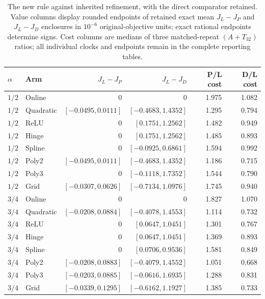 \begin{table}[htbp]
\centering\scriptsize
\setlength{\tabcolsep}{3pt}
\caption{The new rule against inherited refinement, with the direct comparator retained. Value columns display rounded endpoints of retained exact mean $J_L-J_P$ and $J_L-J_D$ enclosures in $10^{-6}$ original-objective units; exact rational endpoints determine signs. Cost columns are medians of three matched-repeat $(A+T_{32})$ ratios; all individual clocks and endpoints remain in the complete reporting tables.}
\label{tab:incrementalcomparison120}
\begin{tabular}{llrrrr}
\toprule $\alpha$ & Arm & $J_L-J_P$ & $J_L-J_D$ & P/L cost & D/L cost \\ \midrule
$1/2$ & Online & $0$ & $0$ & 1.975 & 1.082 \\
$1/2$ & Quadratic & $[-0.0495, 0.0111]$ & $[-0.4683, 1.4352]$ & 1.295 & 0.794 \\
$1/2$ & ReLU & $0$ & $[0.1751, 1.2562]$ & 1.482 & 0.949 \\
$1/2$ & Hinge & $0$ & $[0.1751, 1.2562]$ & 1.485 & 0.893 \\
$1/2$ & Spline & $0$ & $[-0.0925, 0.6861]$ & 1.594 & 0.992 \\
$1/2$ & Poly2 & $[-0.0495, 0.0111]$ & $[-0.4683, 1.4352]$ & 1.186 & 0.715 \\
$1/2$ & Poly3 & $0$ & $[-0.1118, 1.7352]$ & 1.544 & 0.790 \\
$1/2$ & Grid & $[-0.0307, 0.0626]$ & $[-0.7134, 1.0976]$ & 1.745 & 0.940 \\
$3/4$ & Online & $0$ & $0$ & 1.827 & 1.070 \\
$3/4$ & Quadratic & $[-0.0208, 0.0884]$ & $[-0.4078, 1.4553]$ & 1.114 & 0.732 \\
$3/4$ & ReLU & $0$ & $[0.0647, 1.0451]$ & 1.301 & 0.767 \\
$3/4$ & Hinge & $0$ & $[0.0647, 1.0451]$ & 1.369 & 0.893 \\
$3/4$ & Spline & $0$ & $[0.0706, 0.9536]$ & 1.581 & 0.849 \\
$3/4$ & Poly2 & $[-0.0208, 0.0883]$ & $[-0.4079, 1.4552]$ & 1.051 & 0.668 \\
$3/4$ & Poly3 & $[-0.0203, 0.0885]$ & $[-0.0616, 1.6935]$ & 1.288 & 0.831 \\
$3/4$ & Grid & $[-0.0339, 0.1295]$ & $[-0.6162, 1.1927]$ & 1.385 & 0.733 \\
\bottomrule
\end{tabular}
\end{table}
